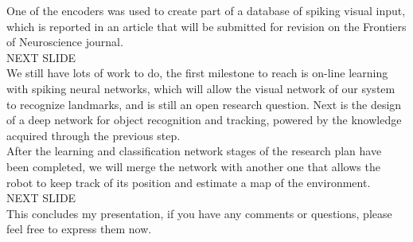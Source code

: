 \documentclass[12t,a4paper]{memoir}
\begin{document}
One of the encoders was used to create part of a database of spiking visual input, which is reported in an article that will be submitted for revision on the Frontiers of Neuroscience journal.\\


{\Large NEXT SLIDE}\\

We still have lots of work to do, the first milestone to reach is on-line learning with spiking neural networks, which will allow the visual network of our system to recognize landmarks, and is still an open research question. Next is the design of a deep network for object recognition and tracking, powered by the knowledge acquired through the previous step.\\

After the learning and classification network stages of the research plan have been completed, we will merge the network with another one that allows the robot to keep track of its position and estimate a map of the environment.\\

{\Large NEXT SLIDE}\\

This concludes my presentation, if you have any comments or questions, please feel free to express them now.\\
\end{document}
